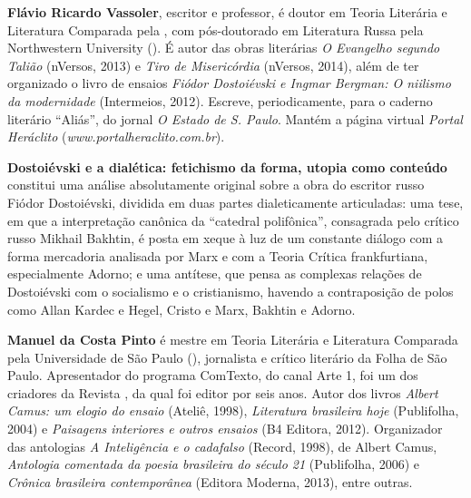 
\textbf{Flávio Ricardo Vassoler}, escritor e professor, é doutor em Teoria Literária e Literatura Comparada pela , com pós-doutorado em Literatura Russa pela Northwestern University (). É autor das obras literárias \emph{O Evangelho segundo Talião} (nVersos, 2013) e \emph{Tiro de Misericórdia} (nVersos, 2014), além de ter organizado o livro de ensaios \emph{Fiódor Dostoiévski e Ingmar Bergman: O niilismo da modernidade} (Intermeios, 2012). Escreve, periodicamente, para o caderno literário ``Aliás'', do jornal \emph{O Estado de S. Paulo}. Mantém a página virtual \emph{Portal Heráclito} (\emph{www.portalheraclito.com.br}).

\textbf{Dostoiévski e a dialética: fetichismo da forma, utopia como conteúdo} constitui uma análise absolutamente original sobre a obra do escritor russo Fiódor Dostoiévski, dividida em duas partes dialeticamente articuladas: uma tese, em que a interpretação canônica da ``catedral polifônica'', consagrada pelo crítico russo Mikhail Bakhtin, é posta em xeque à luz de um constante diálogo com a forma mercadoria analisada por Marx e com a Teoria Crítica frankfurtiana, especialmente Adorno; e uma antítese, que pensa as complexas relações de Dostoiévski com o socialismo e o cristianismo, havendo a contraposição de polos como Allan Kardec e Hegel, Cristo e Marx, Bakhtin e Adorno.

\textbf{Manuel da Costa Pinto} é mestre em Teoria Literária e Literatura Comparada pela Universidade de São Paulo (), jornalista e crítico literário da Folha de São Paulo. Apresentador do programa ComTexto, do canal Arte 1, foi um dos criadores da Revista , da qual foi editor por seis anos. Autor dos livros \emph{Albert Camus: um elogio do ensaio} (Ateliê, 1998), \emph{Literatura brasileira hoje} (Publifolha, 2004) e \emph{Paisagens interiores e outros ensaios} (B4 Editora, 2012). Organizador das antologias \emph{A Inteligência e o cadafalso} (Record, 1998), de Albert Camus, \emph{Antologia comentada da poesia brasileira do século 21} (Publifolha, 2006) e \emph{Crônica brasileira contemporânea} (Editora Moderna, 2013), entre outras.






